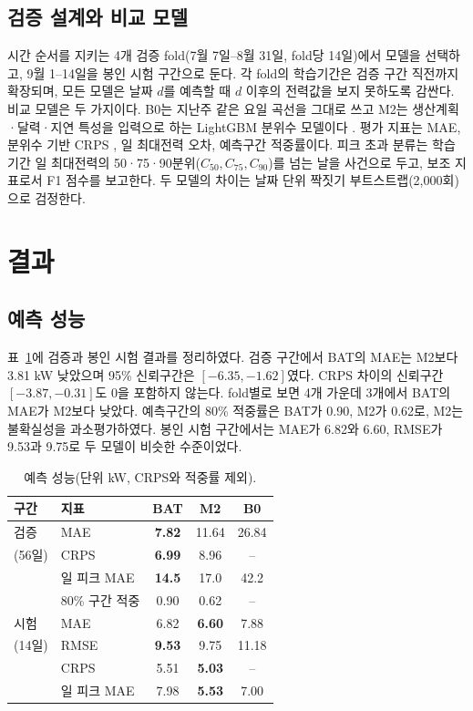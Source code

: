 \subsection{검증 설계와 비교 모델}
시간 순서를 지키는 4개 검증 fold(7월 7일–8월 31일, fold당 14일)에서 모델을 선택하고, 9월 1–14일을 봉인 시험 구간으로 둔다. 각 fold의 학습기간은 검증 구간 직전까지 확장되며, 모든 모델은 날짜 $d$를 예측할 때 $d$ 이후의 전력값을 보지 못하도록 감싼다. 비교 모델은 두 가지이다. B0는 지난주 같은 요일 곡선을 그대로 쓰고 M2는 생산계획·달력·지연 특성을 입력으로 하는 LightGBM 분위수 모델이다 \citep{ke2017lightgbm}. 평가 지표는 MAE, 분위수 기반 CRPS \citep{gneiting2007scoring}, 일 최대전력 오차, 예측구간 적중률이다. 피크 초과 분류는 학습기간 일 최대전력의 50·75·90분위($C_{50},C_{75},C_{90}$)를 넘는 날을 사건으로 두고, 보조 지표로서 F1 점수를 보고한다. 두 모델의 차이는 날짜 단위 짝짓기 부트스트랩(2,000회)으로 검정한다.

\section{결과}

\subsection{예측 성능}
표~\ref{tab:main}에 검증과 봉인 시험 결과를 정리하였다. 검증 구간에서 BAT의 MAE는 M2보다 3.81 kW 낮았으며 95\% 신뢰구간은 $[-6.35,-1.62]$였다. CRPS 차이의 신뢰구간 $[-3.87,-0.31]$도 0을 포함하지 않는다. fold별로 보면 4개 가운데 3개에서 BAT의 MAE가 M2보다 낮았다. 예측구간의 80\% 적중률은 BAT가 0.90, M2가 0.62로, M2는 불확실성을 과소평가하였다. 봉인 시험 구간에서는 MAE가 6.82와 6.60, RMSE가 9.53과 9.75로 두 모델이 비슷한 수준이었다.

\begin{table}[t]
\centering
\small
\begin{tabular}{@{}llccc@{}}
\toprule
구간 & 지표 & BAT & M2 & B0 \\
\midrule
검증 & MAE & \textbf{7.82} & 11.64 & 26.84 \\
(56일) & CRPS & \textbf{6.99} & 8.96 & -- \\
 & 일 피크 MAE & \textbf{14.5} & 17.0 & 42.2 \\
 & 80\% 구간 적중 & 0.90 & 0.62 & -- \\
\midrule
시험 & MAE & 6.82 & \textbf{6.60} & 7.88 \\
(14일) & RMSE & \textbf{9.53} & 9.75 & 11.18 \\
 & CRPS & 5.51 & \textbf{5.03} & -- \\
 & 일 피크 MAE & 7.98 & \textbf{5.53} & 7.00 \\
\bottomrule
\end{tabular}
\caption{예측 성능(단위 kW, CRPS와 적중률 제외).}
\label{tab:main}
\end{table}


